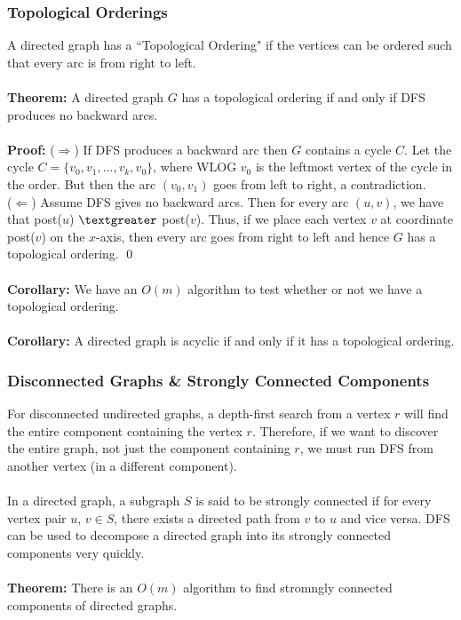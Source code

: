 \documentclass{article}
\newcommand{\gt}{\textgreater}
\newcommand{\imply}{\Rightarrow}
\newcommand{\thm}{\textbf{Theorem: }}
\newcommand{\cor}{\textbf{Corollary: }}
\newcommand{\proo}{\textbf{Proof: }}
\begin{document}
\subsubsection{Topological Orderings}
A directed graph has a ``Topological Ordering" if the vertices can be ordered such that every arc is from right to left.\\\\
\thm A directed graph $G$ has a topological ordering if and only if DFS produces no backward arcs.\\\\
\proo ($\imply$) If DFS produces a backward arc then $G$ contains a cycle $C$. Let the cycle $C = \{v_0, v_1, \dots, v_k, v_0\}$, where WLOG $v_0$ is the leftmost vertex of the cycle in the order. But then the arc $(v_0, v_1)$ goes from left to right, a contradiction.\\
($\Leftarrow$) Assume DFS gives no backward arcs. Then for every arc $(u, v)$, we have that post($u$) $\gt$ post($v$). Thus, if we place each vertex $v$ at coordinate post($v$) on the $x$-axis, then every arc goes from right to left and hence $G$ has a topological ordering.
\qed\\\\
\cor We have an $O(m)$ algorithm to test whether or not we have a topological ordering.\\\\
\cor A directed graph is acyclic if and only if it has a topological ordering.
\subsubsection{Disconnected Graphs \& Strongly Connected Components}
For disconnected undirected graphs, a depth-first search from a vertex $r$ will find the entire component containing the vertex $r$. Therefore, if we want to discover the entire graph, not just the component containing $r$, we must run DFS from another vertex (in a different component).\\\\
In a directed graph, a subgraph $S$ is said to be strongly connected if for every vertex pair $u$, $v \in S$, there exists a directed path from $v$ to $u$ and vice versa. DFS can be used to decompose a directed graph into its strongly connected components very quickly.\\\\
\thm There is an $O(m)$ algorithm to find stromngly connected components of directed graphs.
\newpage
\end{document}
